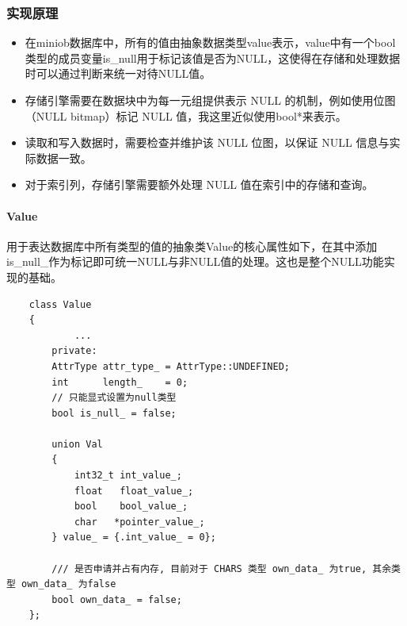 \documentclass[a4paper, 12pt]{article}
\begin{document}
\subsubsection{实现原理}
\begin{itemize}
    \item 在miniob数据库中，所有的值由抽象数据类型value表示，value中有一个bool类型的成员变量is\_null用于标记该值是否为NULL，这使得在存储和处理数据时可以通过判断来统一对待NULL值。
    \item 存储引擎需要在数据块中为每一元组提供表示 NULL 的机制，例如使用位图（NULL bitmap）标记 NULL 值，我这里近似使用bool*来表示。
    \item 读取和写入数据时，需要检查并维护该 NULL 位图，以保证 NULL 信息与实际数据一致。
    \item 对于索引列，存储引擎需要额外处理 NULL 值在索引中的存储和查询。
\end{itemize}

\paragraph{\textbf{Value}}
用于表达数据库中所有类型的值的抽象类Value的核心属性如下，在其中添加is\_null\_作为标记即可统一NULL与非NULL值的处理。这也是整个NULL功能实现的基础。
\begin{lstlisting}
    class Value
    {
            ...
        private:
        AttrType attr_type_ = AttrType::UNDEFINED;
        int      length_    = 0;
        // 只能显式设置为null类型
        bool is_null_ = false;

        union Val
        {
            int32_t int_value_;
            float   float_value_;
            bool    bool_value_;
            char   *pointer_value_;
        } value_ = {.int_value_ = 0};

        /// 是否申请并占有内存, 目前对于 CHARS 类型 own_data_ 为true, 其余类型 own_data_ 为false
        bool own_data_ = false;
    };
\end{lstlisting}
\end{document}
